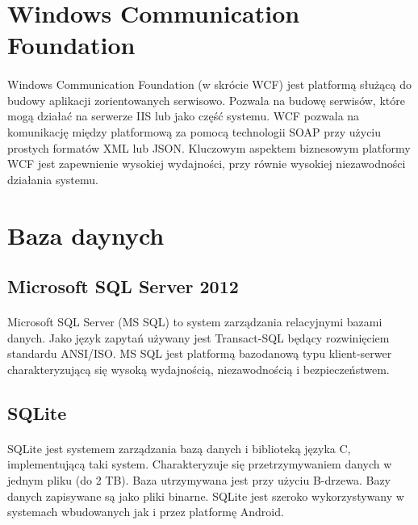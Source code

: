 \section{ Windows Communication Foundation }
\label{sec:wcf}
\paragraph{}
Windows Communication Foundation (w skrócie WCF) jest platformą służącą do budowy aplikacji zorientowanych serwisowo. Pozwala na budowę serwisów, które mogą działać na serwerze IIS lub jako część systemu. WCF pozwala na komunikację między platformową za pomocą technologii SOAP przy użyciu prostych formatów XML lub JSON. Kluczowym aspektem biznesowym platformy WCF jest zapewnienie wysokiej wydajności, przy równie wysokiej niezawodności działania systemu.

\section{Baza daynych}

\subsection{Microsoft SQL Server 2012}
\label{sub:mssql}
\paragraph{}
Microsoft SQL Server (MS SQL) to system zarządzania relacyjnymi bazami danych. Jako język zapytań używany jest Transact-SQL będący rozwinięciem standardu ANSI/ISO. MS SQL jest platformą bazodanową typu klient-serwer charakteryzującą się wysoką wydajnością, niezawodnością i bezpieczeństwem.

\subsection{SQLite} %
\label{sub:sqlite}
\paragraph{} %
SQLite jest systemem zarządzania bazą danych i biblioteką języka C, implementującą taki system. Charakteryzuje się przetrzymywaniem danych w jednym pliku (do 2 TB). Baza utrzymywana jest przy użyciu B-drzewa. Bazy danych zapisywane są jako pliki binarne. SQLite jest szeroko wykorzystywany w systemach wbudowanych jak i przez platformę Android.

